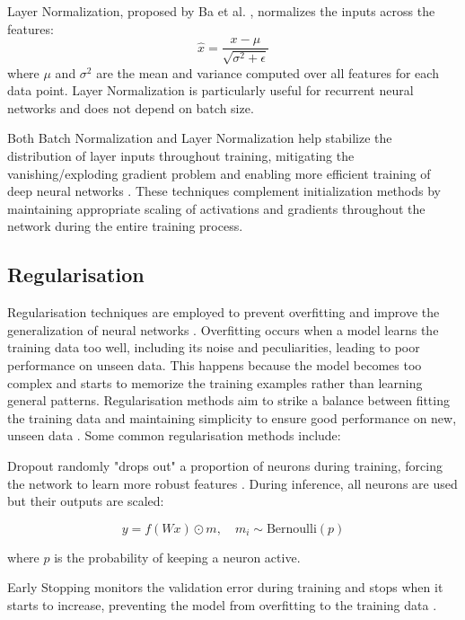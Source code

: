 \documentclass[a4paper, oneside]{discothesis}
\begin{document}
Layer Normalization, proposed by Ba et al. \cite{ba2016layer}, normalizes the inputs across the features:
\begin{equation}
    \hat{x} = \frac{x - \mu}{\sqrt{\sigma^2 + \epsilon}}
\end{equation}
where $\mu$ and $\sigma^2$ are the mean and variance computed over all features for each data point. Layer Normalization is particularly useful for recurrent neural networks and does not depend on batch size.

Both Batch Normalization and Layer Normalization help stabilize the distribution of layer inputs throughout training, mitigating the vanishing/exploding gradient problem and enabling more efficient training of deep neural networks \cite{santurkar2018does}. These techniques complement initialization methods by maintaining appropriate scaling of activations and gradients throughout the network during the entire training process.

\subsection{Regularisation}

Regularisation techniques are employed to prevent overfitting and improve the generalization of neural networks \cite{goodfellow2016deep}. Overfitting occurs when a model learns the training data too well, including its noise and peculiarities, leading to poor performance on unseen data. This happens because the model becomes too complex and starts to memorize the training examples rather than learning general patterns. Regularisation methods aim to strike a balance between fitting the training data and maintaining simplicity to ensure good performance on new, unseen data \cite{bishop2006pattern}. Some common regularisation methods include:

Dropout randomly "drops out" a proportion of neurons during training, forcing the network to learn more robust features \cite{srivastava2014dropout}. During inference, all neurons are used but their outputs are scaled:

\begin{equation}
    y = f(Wx) \odot m, \quad m_i \sim \text{Bernoulli}(p)
\end{equation}

where $p$ is the probability of keeping a neuron active.

Early Stopping monitors the validation error during training and stops when it starts to increase, preventing the model from overfitting to the training data \cite{prechelt1998early}.
\end{document}
